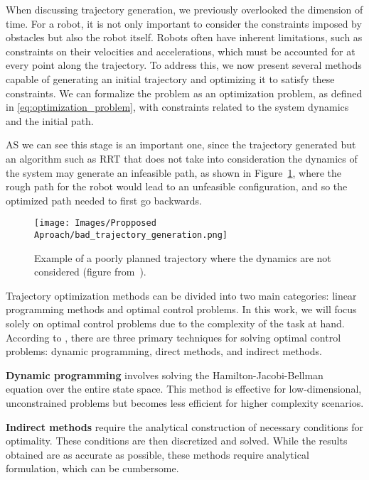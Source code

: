When discussing trajectory generation, we previously overlooked the dimension of time. For a robot, it is not only important to consider the constraints imposed by obstacles but also the robot itself. Robots often have inherent limitations, such as constraints on their velocities and accelerations, which must be accounted for at every point along the trajectory. To address this, we now present several methods capable of generating an initial trajectory and optimizing it to satisfy these constraints. We can formalize the problem as an optimization problem, as defined in \ref{eq:optimization_problem}, with constraints related to the system dynamics and the initial path.

AS we can see this stage is an important one, since the trajectory generated but an algorithm such as RRT that does not take into consideration the dynamics of the system may generate an infeasible path, as shown in Figure~\ref{eq:Proposed Approach: Space Cobot: Bad trajectory generation}, where the rough path for the robot would lead to an unfeasible configuration, and so the optimized path needed to first go backwards.

\begin{figure}
    \centering
    \texttt{[image: Images/Propposed Aproach/bad\_trajectory\_generation.png]}
    \caption{Example of a poorly planned trajectory where the dynamics are not considered (figure from~\cite{bergman2021exploiting}).}
    \label{eq:Proposed Approach: Space Cobot: Bad trajectory generation}
\end{figure}


Trajectory optimization methods can be divided into two main categories: linear programming methods and optimal control problems. In this work, we will focus solely on optimal control problems due to the complexity of the task at hand. According to \cite{kelly2017introduction}, there are three primary techniques for solving optimal control problems: dynamic programming, direct methods, and indirect methods.

\textbf{Dynamic programming} involves solving the Hamilton-Jacobi-Bellman equation over the entire state space. This method is effective for low-dimensional, unconstrained problems but becomes less efficient for higher complexity scenarios.

\textbf{Indirect methods} require the analytical construction of necessary conditions for optimality. These conditions are then discretized and solved. While the results obtained are as accurate as possible, these methods require analytical formulation, which can be cumbersome.

